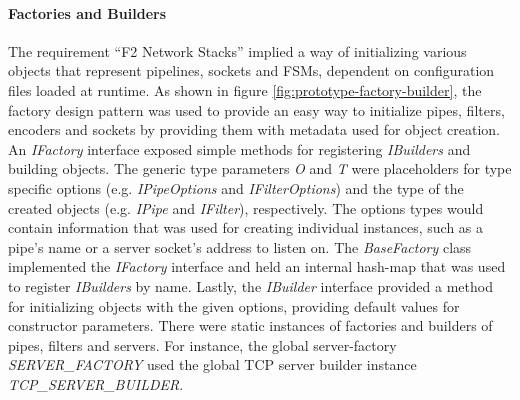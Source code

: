 \paragraph{Factories and Builders}
The requirement \enquote{F2 Network Stacks} implied a way of initializing various objects that represent pipelines, sockets and \acp{FSM}, dependent on configuration files loaded at runtime. As shown in figure \ref{fig:prototype-factory-builder}, the factory design pattern was used to provide an easy way to initialize pipes, filters, encoders and sockets by providing them with metadata used for object creation. An \emph{IFactory} interface exposed simple methods for registering \emph{IBuilders} and building objects. The generic type parameters \emph{O} and \emph{T} were placeholders for type specific options (e.g. \emph{IPipeOptions} and \emph{IFilterOptions}) and the type of the created objects (e.g. \emph{IPipe} and \emph{IFilter}), respectively. The options types would contain information that was used for creating individual instances, such as a pipe's name or a server socket's address to listen on. The \emph{BaseFactory} class implemented the \emph{IFactory} interface and held an internal hash-map that was used to register \emph{IBuilders} by name. Lastly, the \emph{IBuilder} interface provided a method for initializing objects with the given options, providing default values for constructor parameters. There were static instances of factories and builders of pipes, filters and servers. For instance, the global server-factory \emph{SERVER\_FACTORY} used the global TCP server builder instance \emph{TCP\_SERVER\_BUILDER}.


